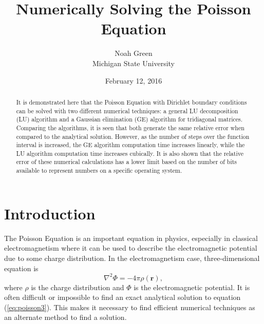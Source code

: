 \documentclass[a4paper,12pt]{report}
\begin{document}
\title{Numerically Solving the Poisson Equation}
\author{Noah Green \\ Michigan State University}
\date{ February 12, 2016}
\maketitle
\begin{abstract}
 It is demonstrated here that the Poisson Equation with Dirichlet boundary conditions can be solved with two different numerical techniques: a general LU decomposition (LU) algorithm and a Gaussian elimination (GE) algorithm for tridiagonal matrices. Comparing the algorithms, it is seen that both generate the same relative error when compared to the analytical solution. However, as the number of steps over the function interval is increased, the GE algorithm computation time increases linearly, while the LU algorithm computation time increases cubically. It is also shown that the relative error of these numerical calculations has a lower limit based on the number of bits available to represent numbers on a specific operating system.
\end{abstract}

\doublespacing
\section{Introduction}
The Poisson Equation is an important equation in physics, especially in classical electromagnetism where it can be used to describe the electromagnetic potential due to some charge distribution. In the electromagnetism case, three-dimensional equation is
\begin{equation}
\label{eq:poisson3}
 \nabla^2\Phi = -4\pi\rho(\boldsymbol{r}),
\end{equation}
where $\rho$ is the charge distribution and $\Phi$ is the electromagnetic potential. It is often difficult or impossible to find an exact analytical solution to equation (\ref{eq:poisson3}). This makes it necessary to find efficient numerical techniques as an alternate method to find a solution. 
\end{document}

